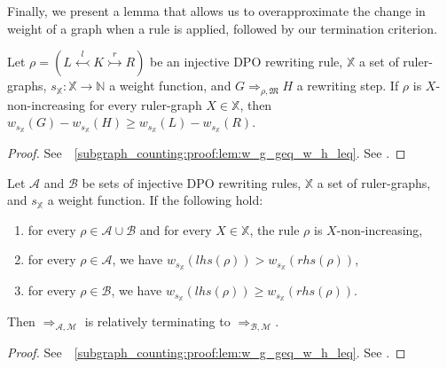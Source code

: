 Finally, we present a lemma that allows us to overapproximate the change in weight of a graph when a rule is applied, followed by our termination criterion. 

\begin{lemma}
    \label{subgraph_counting:lem:w_g_geq_w_h_leq}
    Let $\rho = (L \overset{l}{\leftarrowtail} K \overset{r}{\rightarrowtail} R)$ be an injective DPO rewriting rule,
    \( \mathbb{X} \) a set of ruler-graphs,
    \( s_{\mathbb{X}} \colon \mathbb{X} \to \mathbb{N} \) a weight function,
    and \( G \Rightarrow_{\rho,\mathfrak{M}} H \) a rewriting step. 
    If $\rho$ is \( X \)-non-increasing for every ruler-graph \( X \in \mathbb{X} \), then $
        w_{s_\mathbb{X}}(G) - w_{s_\mathbb{X}}(H) 
        \geq 
        w_{s_\mathbb{X}}(L) - w_{s_\mathbb{X}}(R)
    $.
\end{lemma}
\begin{proof}
    \iflongversion
        See~\textsection~\ref{subgraph_counting:proof:lem:w_g_geq_w_h_leq}.
    \else
        See \cite[Lemma 41]{qiu2025termination}.
    \fi 
\end{proof} 
\begin{theorem}[Termination] 
    \label{subgraph_counting:thm:termination_grs}
    Let \(\mathcal{A}\) and \(\mathcal{B}\) be sets of injective DPO rewriting rules, $\mathbb{X}$ a set of ruler-graphs, and $s_\mathbb{X}$ a weight function. If the following hold:
    \begin{enumerate}
        \item  for every $\rho \in \mathcal{A} \cup \mathcal{B}$ and for every $X \in \mathbb{X}$, the rule $\rho$ is $X$-non-increasing,
        \item for every \(\rho \in \mathcal{A}\), we have \( w_{s_\mathbb{X}}(lhs(\rho)) > w_{s_\mathbb{X}}(rhs(\rho)) \),
        \item for every \(\rho \in \mathcal{B}\), we have \( w_{s_\mathbb{X}}(lhs(\rho)) \geq w_{s_\mathbb{X}}(rhs(\rho)) \).
    \end{enumerate}
    Then \(\Rightarrow_{\mathcal{A},\mathcal{M}}\) is relatively terminating to \(\Rightarrow_{\mathcal{B},\mathcal{M}}\).
\end{theorem}
\begin{proof}
    \iflongversion
        See~\textsection~\ref{subgraph_counting:proof:lem:w_g_geq_w_h_leq}.
    \else
        See \cite[Lemma 41]{qiu2025termination}.
    \fi 
\end{proof} 